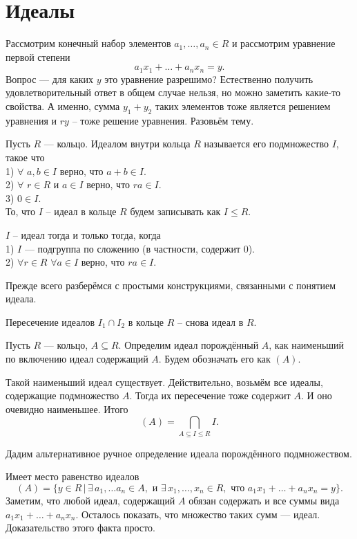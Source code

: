 \section{Идеалы}
Рассмотрим конечный набор элементов $a_1, \dots, a_n \in R$ и рассмотрим уравнение первой степени
$$a_1 x_1 + \dots +a_n x_n =y.$$
Вопрос — для каких $y$ это уравнение разрешимо? Естественно получить удовлетворительный ответ в общем случае нельзя, но можно заметить какие-то свойства. А именно, сумма $y_1+y_2$ таких элементов тоже является решением уравнения и $ry$ -- тоже решение уравнения. Разовьём тему.

\dfn Пусть $R$ --- кольцо. Идеалом внутри кольца $R$ называется его подмножество $I$, такое что\\
1) $\forall$ $a,b \in I$ верно, что $a+b \in I$.\\
2) $\forall$ $r \in R$ и  $a\in I$ верно, что $ ra\in I $.\\
3) $0\in I$.\\
То, что $I$ -- идеал в кольце $R$ будем записывать как $I\leq R$.
\edfn 

\rm $I$ -- идеал тогда и только тогда, когда\\
1) $I$ --- подгруппа по сложению (в частности, содержит 0).\\
2) $\forall r \in R$ $\forall a\in I$ верно, что $ ra\in I $.
\erm

Прежде всего разберёмся с простыми конструкциями, связанными с понятием идеала. 

\rm Пересечение идеалов $I_1\cap I_2$ в кольце $R$ -- снова идеал в $R$.
\erm



 Пусть $R$ --- кольцо, $A\subseteq R$. Определим идеал порождённый $A$, как наименьший по включению идеал содержащий $A$. Будем обозначать его как $(A)$.
\edfn

\rm Такой наименьший идеал существует. Действительно, возьмём все идеалы, содержащие подмножество $A$. Тогда их пересечение тоже содержит $A$. И оно очевидно наименьшее. Итого
$$(A)=\bigcap_{A\subseteq I \leq R} I.$$
\erm

Дадим альтернативное ручное определение идеала порождённого подмножеством.

 Имеет место равенство идеалов 
$$( A ) = \{ y\in R \,|\, \exists\, a_1,\dots a_n \in A,\text{ и } \exists\, x_1,\dots, x_n \in R,\text{ что } a_1 x_1 + \dots +a_n x_n =y\}.$$
\elm
\proof Заметим, что любой идеал, содержащий $A$ обязан содержать и все суммы вида $a_1 x_1 + \dots +a_n x_n$. Осталось показать, что множество таких сумм --- идеал. Доказательство этого факта просто.
\endproof

